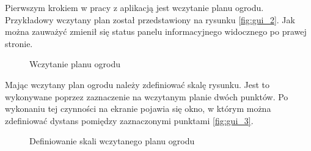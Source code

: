 \documentclass[twoside]{iisthesis}
\begin{document}
Pierwszym krokiem w pracy z aplikacją jest wczytanie planu ogrodu. Przykładowy wczytany plan został przedstawiony na rysunku \eqref{fig:gui_2}. Jak można zauważyć zmienił się status panelu informacyjnego widocznego po prawej stronie.
\begin{figure}[!htb]
	\centering
	\caption{Wczytanie planu ogrodu}
	\label{fig:gui_2}
\end{figure}

Mając wczytany plan ogrodu należy zdefiniować skalę rysunku. Jest to wykonywane poprzez zaznaczenie na wczytanym planie dwóch punktów. Po wykonaniu tej czynności na ekranie pojawia się okno, w którym można zdefiniować dystans pomiędzy zaznaczonymi punktami \eqref{fig:gui_3}.
\begin{figure}[!htb]
	\centering
	\caption{Definiowanie skali wczytanego planu ogrodu}
	\label{fig:gui_3}
\end{figure}
\end{document}
